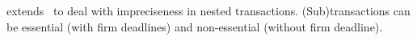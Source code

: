 \documentclass[10pt, conference, compsocconf]{IEEEtran}
\begin{document}
\cite{1530682} extends~\cite{1420972} to deal with impreciseness in nested transactions. (Sub)transactions can be essential (with firm deadlines) and non-essential (without firm deadline). 
\end{document}
